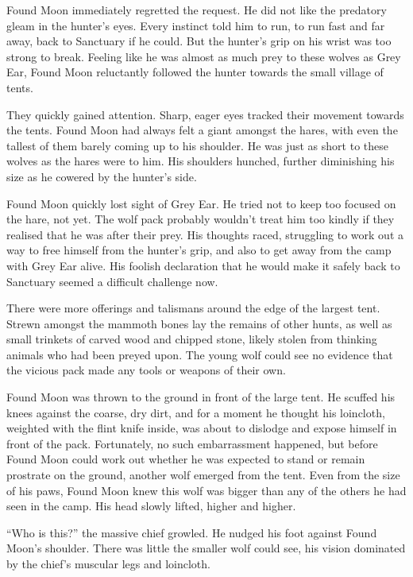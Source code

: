 Found Moon immediately regretted the request. He did not like the predatory gleam in the hunter's eyes. Every instinct told him to run, to run fast and far away, back to Sanctuary if he could. But the hunter's grip on his wrist was too strong to break. Feeling like he was almost as much prey to these wolves as Grey Ear, Found Moon reluctantly followed the hunter towards the small village of tents.

They quickly gained attention. Sharp, eager eyes tracked their movement towards the tents. Found Moon had always felt a giant amongst the hares, with even the tallest of them barely coming up to his shoulder. He was just as short to these wolves as the hares were to him. His shoulders hunched, further diminishing his size as he cowered by the hunter's side.

Found Moon quickly lost sight of Grey Ear. He tried not to keep too focused on the hare, not yet. The wolf pack probably wouldn't treat him too kindly if they realised that he was after their prey. His thoughts raced, struggling to work out a way to free himself from the hunter's grip, and also to get away from the camp with Grey Ear alive. His foolish declaration that he would make it safely back to Sanctuary seemed a difficult challenge now.

There were more offerings and talismans around the edge of the largest tent. Strewn amongst the mammoth bones lay the remains of other hunts, as well as small trinkets of carved wood and chipped stone, likely stolen from thinking animals who had been preyed upon. The young wolf could see no evidence that the vicious pack made any tools or weapons of their own.

Found Moon was thrown to the ground in front of the large tent. He scuffed his knees against the coarse, dry dirt, and for a moment he thought his loincloth, weighted with the flint knife inside, was about to dislodge and expose himself in front of the pack. Fortunately, no such embarrassment happened, but before Found Moon could work out whether he was expected to stand or remain prostrate on the ground, another wolf emerged from the tent. Even from the size of his paws, Found Moon knew this wolf was bigger than any of the others he had seen in the camp. His head slowly lifted, higher and higher.

``Who is this?'' the massive chief growled. He nudged his foot against Found Moon's shoulder. There was little the smaller wolf could see, his vision dominated by the chief's muscular legs and loincloth.

